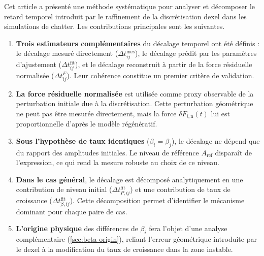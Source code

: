 \documentclass[11pt,a4paper]{article}
\newcommand{\dFin}{\delta F_{i,\mathrm{n}}}    %
\newcommand{\betai}{\beta_i}                   %
\newcommand{\Aref}{A_{\mathrm{ref}}}           %
\newcommand{\Dtmes}{\Delta t_{ij}^{\mathrm{mes}}}
\newcommand{\Dtfit}{\Delta t_{ij}^{\mathrm{fit}}}
\newcommand{\DtF}{\Delta t_{ij}^{F}}
\newcommand{\DtPfit}{\Delta t_{P,ij}^{\mathrm{fit}}}
\newcommand{\Dtbfit}{\Delta t_{\beta,ij}^{\mathrm{fit}}}
\begin{document}
Cet article a présenté une méthode systématique pour analyser et décomposer le
retard temporel introduit par le raffinement de la discrétisation dexel dans
les simulations de chatter. Les contributions principales sont les suivantes.

\begin{enumerate}
    \item \textbf{Trois estimateurs complémentaires} du décalage temporel ont
    été définis : le décalage mesuré directement (\(\Dtmes\)), le décalage
    prédit par les paramètres d'ajustement (\(\Dtfit\)), et le décalage
    reconstruit à partir de la force résiduelle normalisée (\(\DtF\)). Leur
    cohérence constitue un premier critère de validation.

    \item \textbf{La force résiduelle normalisée} est utilisée comme proxy
    observable de la perturbation initiale due à la discrétisation. Cette
    perturbation géométrique ne peut pas être mesurée directement, mais la
    force \(\dFin(t)\) lui est proportionnelle d'après le modèle régénératif.

    \item \textbf{Sous l'hypothèse de taux identiques} (\(\betai = \beta_j\)),
    le décalage ne dépend que du rapport des amplitudes initiales. Le niveau
    de référence \(\Aref\) disparaît de l'expression, ce qui rend la mesure
    robuste au choix de ce niveau.

    \item \textbf{Dans le cas général}, le décalage est décomposé
    analytiquement en une contribution de niveau initial (\(\DtPfit\)) et une
    contribution de taux de croissance (\(\Dtbfit\)). Cette décomposition
    permet d'identifier le mécanisme dominant pour chaque paire de cas.

    \item \textbf{L'origine physique} des différences de \(\betai\) fera
    l'objet d'une analyse complémentaire (\ref{sec:beta-origin}), reliant
    l'erreur géométrique introduite par le dexel à la modification du taux de
    croissance dans la zone instable.
\end{enumerate}

\end{document}
